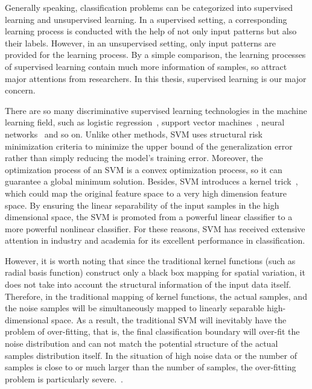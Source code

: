 \documentclass[master]{IPSstyle}
\begin{document}
Generally speaking, classification problems can be categorized into supervised learning and unsupervised learning. In a supervised setting, a corresponding learning process is conducted with the help of not only input patterns but also their labels. However, in an unsupervised setting, only input patterns are provided for the learning process. By a simple comparison, the learning processes of supervised learning contain much more information of samples, so attract major attentions from researchers. In this thesis, supervised learning is our major concern.

There are so many discriminative supervised learning technologies in the machine learning field, such as logistic regression~\cite{menard2002applied}, support vector machines~\cite{cortes1995support,vapnik2000nature}, neural networks~\cite{hornik1989multilayer} and so on.  Unlike other methods, SVM uses structural risk minimization criteria to minimize the upper bound of the generalization error rather than simply reducing the model's training error. Moreover, the optimization process of an SVM is a convex optimization process, so it can guarantee a global minimum solution. Besides, SVM introduces a kernel trick~\cite{scholkopf2001learning}, which could map the original feature space to a very high dimension feature space. By ensuring the linear separability of the input samples in the high dimensional space, the SVM is promoted from a powerful linear classifier to a more powerful nonlinear classifier. For these reasons, SVM has received extensive attention in industry and academia for its excellent performance in classification. 

However, it is worth noting that since the traditional kernel functions (such as radial basis function) construct only a black box mapping for spatial variation, it does not take into account the structural information of the input data itself. Therefore, in the traditional mapping of kernel functions, the actual samples, and the noise samples will be simultaneously mapped to linearly separable high-dimensional space. As a result, the traditional SVM will inevitably have the problem of over-fitting, that is, the final classification boundary will over-fit the noise distribution and can not match the potential structure of the actual samples distribution itself. In the situation of high noise data or the number of samples is close to or much larger than the number of samples, the over-fitting problem is particularly severe.~\cite{barutcuoglu2006hierarchical,diplaris2005protein}. 
\end{document}

